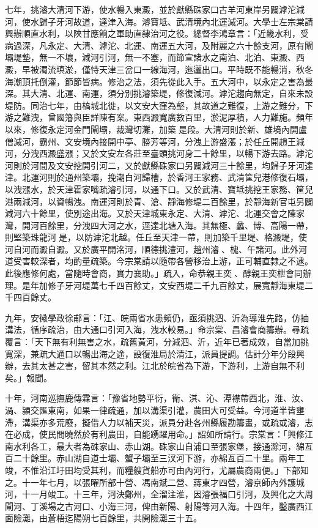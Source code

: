 \begin{pinyinscope}
七年，挑濬大清河下游，使水暢入東澱，並於獻縣硃家口古羊河東岸另闢滹沱減河，使水歸子牙河故道，達津入海。濬寶坻、武清境內北運減河。大學士左宗棠請興辦順直水利，以陜甘應餉之軍助直隸治河之役。總督李鴻章言：「近畿水利，受病過深，凡永定、大清、滹沱、北運、南運五大河，及附麗之六十餘支河，原有閘壩堤墊，無一不壞，減河引河，無一不塞，而節宣諸水之南泊、北泊、東澱、西澱，早被濁流填淤，僅恃天津三岔口一線海河，迤邐出口。平時既不能暢消，秋冬海潮頂托倒灌，節節皆病。修治之法，須先從此入手。五大河中，以永定之害為最深。其大清、北運、南運，須分別挑濬築堤，修復減河。滹沱趨向無定，自來未設堤防。同治七年，由槁城北徙，以文安大窪為壑，其故道之難復，上游之難分，下游之難洩，曾國籓與臣詳陳有案。東西澱寬廣數百里，淤泥厚積，人力難施。頻年以來，修復永定河金門閘壩，裁灣切灘，加築是段。大清河則於新、雄境內開盧僧減河，霸州、文安境內接開中亭、勝芳等河，分洩上游盛漲；於任丘開趙王減河，分洩西澱盛漲；又於文安左各莊至臺頭挑河身二十餘里，以暢下游去路。滹沱河則於河間及文安挖開引河二，又於獻縣硃家口另闢減河三十餘里，均歸子牙河達津。北運河則於通州築壩，挽潮白河歸槽，於香河王家務、武清筐兒港修復石壩，以洩漲水，於天津霍家嘴疏濬引河，以通下口。又於武清、寶坻挑挖王家務、筐兒港兩減河，以資暢洩。南運河則於青、滄、靜海修堤二百餘里，於靜海新官屯另闢減河六十餘里，使別途出海。又於天津城東永定、大清、滹沱、北運交會之陳家灣，開河百餘里，分洩四大河之水，逕達北塘入海。其無極、蠡、博、高陽一帶，則堅築珠龍河是，以防滹沱北越。任丘至天津一帶，則加築千里堤、格澱堤，使河自河而澱自澱。又於廣平開洺河，順德挑澧河，趙州濬、槐、午諸河。此外河道受害較深者，均酌量疏築。今宗棠請以隨帶各營移治上游，正可輔直隸之不逮。此後應修何處，當隨時會商，實力襄助。」疏入，命恭親王奕、醇親王奕枻會同辦理。是年加修子牙河堤萬七千四百餘丈，文安西堤二千九百餘丈，展寬靜海東堤二千四百餘丈。

九年，安徽學政徐郙言：「江、皖兩省水患頻仍，亟須挑泗、沂為導淮先路，仿抽溝法，循序疏治，由大通口引河入海，洩水較易。」命宗棠、昌濬會商籌辦。尋疏覆言：「天下無有利無害之水，疏舊黃河，分減泗、沂，近年已著成效，自當加挑寬深，兼疏大通口以暢出海之途，設復淮局於清江，派員提調。估計分年分段興辦，去其太甚之害，留其本然之利。江北於皖省為下游，下游利，上游自無不利矣。」報聞。

十年，河南巡撫鹿傳霖言：「豫省地勢平衍，衛、淇、沁、潭襟帶西北，淮、汝、渦、潁交匯東南，如果一律疏通，加以溝渠引灌，農田大可受益。今河道半皆壅滯，溝渠亦多荒廢，擬借人力以補天災，派員分赴各州縣履勘籌畫，或疏或濬，志在必成，使民間曉然於有利農田，自能踴躍用命。」詔如所請行。宗棠言：「興修江南水利各工，最大者為硃家山、赤山湖。硃家山自浦口至張家堡，接通滁河，綿亙百二十餘里。赤山湖自道士壩、蟹子壩至三汊河下游，亦綿亙百二十里。兩年工竣，不惟沿江圩田均受其利，而糧艘貨船亦可由內河行，尤屬農商兩便。」下部知之。十一年七月，以張曜所部十營、馮南斌二營、蔣東才四營，濬京師內外護城河，十一月竣工。十三年，河決鄭州，全溜注淮，因濬張福口引河，及興化之大周閘河、丁溪場之古河口、小海三河，俾由新陽、射陽等河入海。十四年，鑿廣西江面險灘，由蒼梧迄陽朔七百餘里，共開險灘三十五。


\end{pinyinscope}
